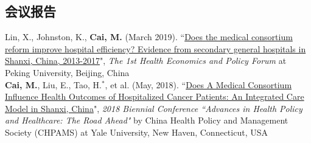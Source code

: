 \documentclass[11pt, a4paper]{article}
\newcommand{\years}[1]{\marginnote{\scriptsize #1}}
\begin{document}
\subsection*{会议报告}
\noindent
\years{2019}Lin, X., Johnston, K., \textbf{Cai, M.} (March 2019). ``\ul{Does the medical consortium reform improve hospital efficiency? Evidence from secondary general hospitals in Shanxi, China, 2013-2017}", \emph{The 1st Health Economics and Policy Forum} at Peking University, Beijing, China\\[6pt]
\years{2018}\textbf{Cai, M.}, Liu, E., Tao, H.$^\ast$, et al. (May, 2018). ``\ul{Does A Medical Consortium Influence Health Outcomes of Hospitalized Cancer Patients: An Integrated Care Model in Shanxi, China}", \emph{2018 Biennial Conference ``Advances in Health Policy and Healthcare: The Road Ahead"} by China Health Policy and Management Society (CHPAMS) at Yale University, New Haven, Connecticut, USA
\end{document}
